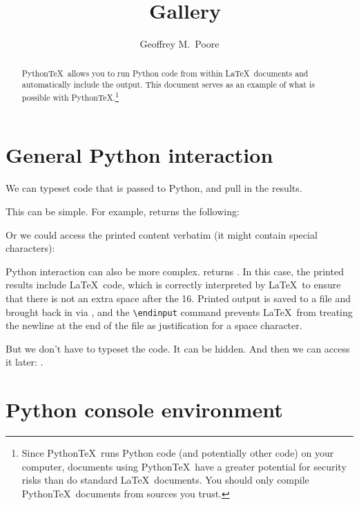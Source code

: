 \documentclass[11pt]{article}
\title{\pytex\ Gallery}
\author{Geoffrey M.\ Poore}
\newcommand{\pytex}{Python\TeX}
\begin{document}
\maketitle


\begin{abstract}
\pytex\ allows you to run Python code from within \LaTeX\ documents and automatically include the output.  This document serves as an example of what is possible with \pytex.\footnote{Since \pytex\ runs Python code (and potentially other code) on your computer, documents using \pytex\ have a greater potential for security risks than do standard \LaTeX\ documents.  You should only compile \pytex\ documents from sources you trust.}
\end{abstract}



\section{General Python interaction}

We can typeset code that is passed to Python, and pull in the results.

This can be simple.  For example,  returns the following:
\begin{quote}
\printpythontex
\end{quote}

Or we could access the printed content verbatim (it might contain special characters):
\begin{quote}
\printpythontex[verb]
\end{quote}

Python interaction can also be more complex.   returns \printpythontex.  In this case, the printed results include \LaTeX\ code, which is correctly interpreted by \LaTeX\ to ensure that there is not an extra space after the 16.  Printed output is saved to a file and brought back in via \verb||, and the \verb|\endinput| command prevents \LaTeX\ from treating the newline at the end of the file as justification for a space character.

But we don't have to typeset the code.  It can be hidden.  And then we can access it later:  .


\section{Python console environment}
\end{document}
